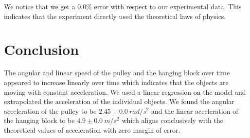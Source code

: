 \documentclass[12pt]{article}
\begin{document}
We notice that we get a $0.0$\% error with respect to our experimental data. This indicates that the experiment directly used the theoretical laws of physics.
\paragraph{}

\section{Conclusion}
The angular and linear speed of the pulley and the hanging block over time appeared to increase linearly over time which indicates that the objects are moving with constant acceleration. We used a linear regression on the model and extrapolated the acceleration of the individual objects. We found the angular acceleration of the pulley to be $2.45 \pm \SI{0.0}{rad/s^2}$ and the linear acceleration of the hanging block to be $4.9 \pm \SI{0.0}{m/s^2}$ which aligns conclusively with the theoretical values of acceleration with zero margin of error.
\end{document}
